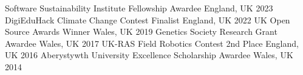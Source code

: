 


\begin{cvhonors}

  \cvhonor
    {Software Sustainability Institute Fellowship} %
    {Awardee} %
    {England, UK} %
    {2023} %
  \cvhonor
    {DigiEduHack Climate Change Contest} %
    {Finalist} %
    {England, UK} %
    {2022} %
  \cvhonor
    {UK Open Source Awards} %
    {Winner} %
    {Wales, UK} %
    {2019} %
  \cvhonor
    {Genetics Society Research Grant} %
    {Awardee} %
    {Wales, UK} %
    {2017} %
  \cvhonor
    {UK-RAS Field Robotics Contest} %
    {2nd Place} %
    {England, UK} %
    {2016} %
  \cvhonor
    {Aberystywth University Excellence Scholarship} %
    {Awardee} %
    {Wales, UK} %
    {2014} %
\end{cvhonors}